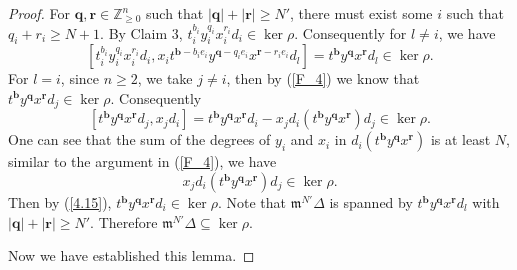 \documentclass[12pt,a4paper]{amsart}
\numberwithin{equation}{section}
\newcommand{\Z}{\mathbb{Z}}
\def\mm{\mathfrak{m}}
\def\br{\mathbf{r}}
\def\bb{\mathbf{b}}
\begin{document}
\begin{proof}
 For $\mathbf{q},\mathbf{r}\in \Z_{\geq 0}^n$ such that  $|\mathbf{q}|+|\mathbf{r}|\geq N'$, there must exist some $i$ such that $q_i+r_i\geq N+1$.  By Claim 3, $t_i^{b_i}y_i^{q_i}x_i^{r_i}d_i\in \ker \rho$. Consequently  for $l\neq i$, we have
\begin{equation}\label{F_4}
[t_i^{b_i}y_i^{q_i}x_i^{r_i}d_i,x_i
t^{\mathbf{b}-b_ie_i}y^{\mathbf{q}-q_ie_i}x^{\mathbf{r}-r_ie_i}d_l]
=t^{\mathbf{b}}y^{\mathbf{q}}x^{\mathbf{r}}d_l\in \ker\rho.
\end{equation}
For $l=i$, since $n\geq2$, we take $j\neq i$, then by (\ref{F_4}) we know that $t^{\mathbf{b}}y^{\mathbf{q}}x^{\mathbf{r}}d_j\in \ker\rho$.
Consequently
\begin{equation}\label{4.15}[t^{\mathbf{b}}y^{\mathbf{q}}x^{\mathbf{r}}d_j, x_jd_i]=t^{\mathbf{b}}y^{\mathbf{q}}x^{\mathbf{r}}d_i-x_jd_i(t^{\mathbf{b}}y^{\mathbf{q}}x^{\mathbf{r}})d_j\in \ker\rho.\end{equation}
One can see that the sum of the degrees of $y_i$ and $x_i$ in $d_i(t^{\bb}y^{\mathbf{q}}x^{\br})$ is at least $N$, similar to the argument in (\ref{F_4}), we have
$$x_jd_i(t^{\mathbf{b}}y^{\mathbf{q}}x^{\mathbf{r}})d_j\in \ker\rho.$$
 Then by (\ref{4.15}), $t^{\mathbf{b}}y^{\mathbf{q}}x^{\mathbf{r}}d_i\in \ker\rho$.  Note that $\mm^{N'}\Delta$ is spanned by $t^{\mathbf{b}}y^{\mathbf{q}}x^{\mathbf{r}}d_l$ with $|\mathbf{q}|+|\mathbf{r}|\geq N'$. Therefore $\mm^{N'}\Delta \subseteq \ker\rho$.

Now we have established this lemma.
\end{proof}
\end{document}
